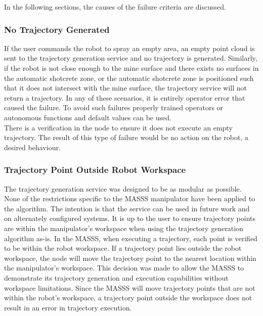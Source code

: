 In the following sections, the causes of the failure criteria are discussed.

\subsubsection{No Trajectory Generated}

If the user commands the robot to spray an empty area, an empty point cloud is sent to the trajectory generation service and no trajectory is generated. Similarly, if the robot is not close enough to the mine surface and there exists no surfaces in the automatic shotcrete zone, or the automatic shotcrete zone is positioned such that it does not intersect with the mine surface, the trajectory service will not return a trajectory. In any of these scenarios, it is entirely operator error that caused the failure. To avoid such failures properly trained operators or autonomous functions and default values can be used.\\

There is a verification in the  node to ensure it does not execute an empty trajectory. The result of this type of failure would be no action on the robot, a desired behaviour.

\subsubsection{Trajectory Point Outside Robot Workspace}

The trajectory generation service was designed to be as modular as possible. None of the restrictions specific to the MASSS manipulator have been applied to the algorithm. The intention is that the service can be used in future work and on alternately configured systems. It is up to the user to ensure trajectory points are within the manipulator's workspace when using the trajectory generation algorithm as-is. In the MASSS, when executing a trajectory, each point is verified to be within the robot workspace. If a trajectory point lies outside the robot workspace, the  node will move the trajectory point to the nearest location within the manipulator's workspace. This decision was made to allow the MASSS to demonstrate its trajectory generation and execution capabilities without workspace limitations. Since the MASSS will move trajectory points that are not within the robot's workspace, a trajectory point outside the workspace does not result in an error in trajectory execution.\\


